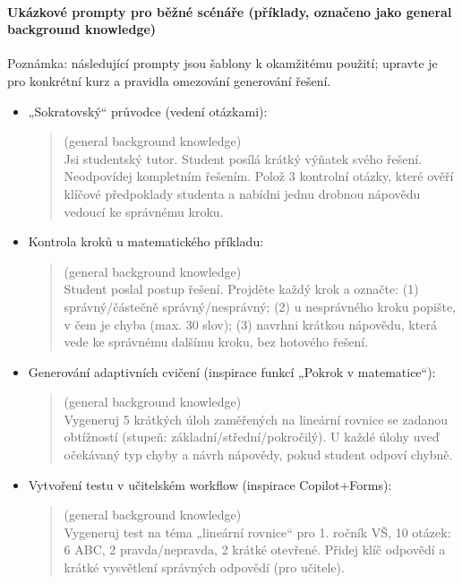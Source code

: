 \documentclass{report}%
\begin{document}
\paragraph{Ukázkové prompty pro běžné scénáře (příklady, označeno jako general background knowledge)}
Poznámka: následující prompty jsou šablony k okamžitému použití; upravte je pro konkrétní kurz a pravidla omezování generování řešení.

\begin{itemize}
  \item „Sokratovský“ průvodce (vedení otázkami):
    \begin{quote}
      (general background knowledge) \\
      Jsi studentský tutor. Student posílá krátký výňatek svého řešení. Neodpovídej kompletním řešením. Polož 3 kontrolní otázky, které ověří klíčové předpoklady studenta a nabídni jednu drobnou nápovědu vedoucí ke správnému kroku.
    \end{quote}

  \item Kontrola kroků u matematického příkladu:
    \begin{quote}
      (general background knowledge) \\
      Student poslal postup řešení. Projděte každý krok a označte: (1) správný/částečně správný/nesprávný; (2) u nesprávného kroku popište, v čem je chyba (max. 30 slov); (3) navrhni krátkou nápovědu, která vede ke správnému dalšímu kroku, bez hotového řešení.
    \end{quote}

  \item Generování adaptivních cvičení (inspirace funkcí „Pokrok v matematice“):
    \begin{quote}
      (general background knowledge) \\
      Vygeneruj 5 krátkých úloh zaměřených na lineární rovnice se zadanou obtížností (stupeň: základní/střední/pokročilý). U každé úlohy uveď očekávaný typ chyby a návrh nápovědy, pokud student odpoví chybně.
    \end{quote}

  \item Vytvoření testu v učitelském workflow (inspirace Copilot+Forms):
    \begin{quote}
      (general background knowledge) \\
      Vygeneruj test na téma „lineární rovnice“ pro 1. ročník VŠ, 10 otázek: 6 ABC, 2 pravda/nepravda, 2 krátké otevřené. Přidej klíč odpovědí a krátké vysvětlení správných odpovědí (pro učitele).
    \end{quote}
\end{itemize}
\end{document}
